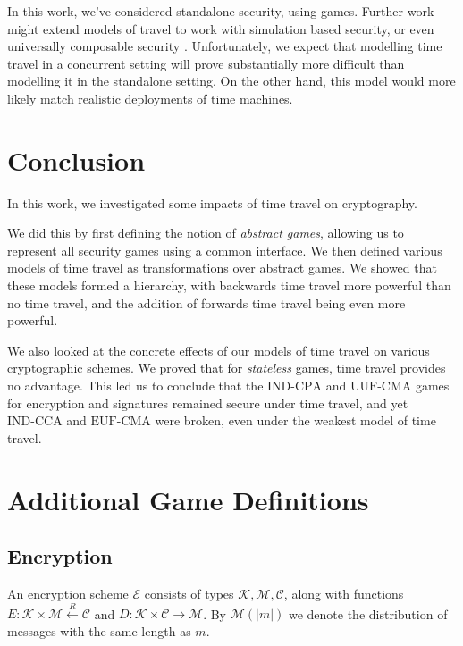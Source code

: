 In this work, we've considered standalone security, using games.
Further work might extend models of travel to work with
simulation based security, or even universally composable security \cite{can01}.
Unfortunately, we expect that modelling time travel in a concurrent setting will prove
substantially more difficult than modelling it in the standalone setting.
On the other hand, this model would more likely match realistic deployments
of time machines.


\section{Conclusion}
In this work, we investigated some impacts of time travel on cryptography.

We did this by first defining the notion of \emph{abstract games},
allowing us to represent all security games using a common interface.
We then defined various models of time travel as transformations over
abstract games.
We showed that these models formed a hierarchy, with backwards
time travel more powerful than no time travel, and the addition
of forwards time travel being even more powerful.

We also looked at the concrete effects of our models of time travel
on various cryptographic schemes.
We proved that for \emph{stateless} games, time travel provides no
advantage.
This led us to conclude that the $\text{IND-CPA}$ and $\text{UUF-CMA}$
games for encryption and signatures remained secure under time travel,
and yet $\text{IND-CCA}$ and $\text{EUF-CMA}$ were broken,
even under the weakest model of time travel.


{\small }
\clearpage
\appendix

\section{Additional Game Definitions}

\subsection{Encryption}

An encryption scheme $\mathcal{E}$ consists of types $\mathcal{K}, \mathcal{M}, \mathcal{C}$,
along with functions $E : \mathcal{K} \times \mathcal{M} \xleftarrow{R} \mathcal{C}$ and $D : \mathcal{K} \times \mathcal{C} \to \mathcal{M}$.
By $\mathcal{M}(|m|)$ we denote the distribution of messages with the same
length as $m$.

